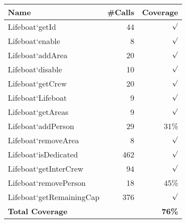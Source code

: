 \begin{longtable}{|l|r|r|}\hline
{\bf Name} & {\bf \#Calls} & {\bf Coverage} \\ \hline\hline
\endhead
Lifeboat`getId & 44 & $\surd$ \\ \hline
Lifeboat`enable & 8 & $\surd$ \\ \hline
Lifeboat`addArea & 20 & $\surd$ \\ \hline
Lifeboat`disable & 10 & $\surd$ \\ \hline
Lifeboat`getCrew & 20 & $\surd$ \\ \hline
Lifeboat`Lifeboat & 9 & $\surd$ \\ \hline
Lifeboat`getAreas & 9 & $\surd$ \\ \hline
Lifeboat`addPerson & 29 & 31\% \\ \hline
Lifeboat`removeArea & 8 & $\surd$ \\ \hline
Lifeboat`isDedicated & 462 & $\surd$ \\ \hline
Lifeboat`getInterCrew & 94 & $\surd$ \\ \hline
Lifeboat`removePerson & 18 & 45\% \\ \hline
Lifeboat`getRemainingCap & 376 & $\surd$ \\ \hline
\hline
{\bf Total Coverage} & & {\bf 76\%} \\ \hline
\end{longtable}

